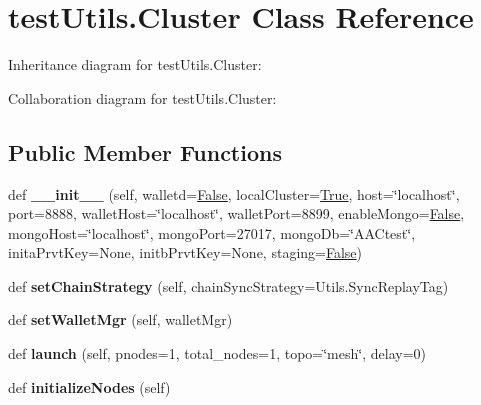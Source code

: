 \hypertarget{classtest_utils_1_1_cluster}{}\section{test\+Utils.\+Cluster Class Reference}
\label{classtest_utils_1_1_cluster}


Inheritance diagram for test\+Utils.\+Cluster\+:


Collaboration diagram for test\+Utils.\+Cluster\+:
\subsection*{Public Member Functions}
\begin{DoxyCompactItemize}
\item 
\mbox{\label{classtest_utils_1_1_cluster_ab2d7ec8d74a311ceee4f6b42bee4f88c}} 
def {\bfseries \+\_\+\+\_\+init\+\_\+\+\_\+} (self, walletd=\mbox{\hyperlink{struct_false}{False}}, local\+Cluster=\mbox{\hyperlink{struct_true}{True}}, host=\char`\"{}localhost\char`\"{}, port=8888, wallet\+Host=\char`\"{}localhost\char`\"{}, wallet\+Port=8899, enable\+Mongo=\mbox{\hyperlink{struct_false}{False}}, mongo\+Host=\char`\"{}localhost\char`\"{}, mongo\+Port=27017, mongo\+Db=\char`\"{}A\+A\+Ctest\char`\"{}, inita\+Prvt\+Key=None, initb\+Prvt\+Key=None, staging=\mbox{\hyperlink{struct_false}{False}})
\item 
\mbox{\label{classtest_utils_1_1_cluster_a304c4b3d051f19d04ddf469395f2e423}} 
def {\bfseries set\+Chain\+Strategy} (self, chain\+Sync\+Strategy=Utils.\+Sync\+Replay\+Tag)
\item 
\mbox{\label{classtest_utils_1_1_cluster_afdb75cb3ad0b2cb8f7f6a6da68f89654}} 
def {\bfseries set\+Wallet\+Mgr} (self, wallet\+Mgr)
\item 
\mbox{\label{classtest_utils_1_1_cluster_a53ea5a1d511716a983eccb1b1c06f7c9}} 
def {\bfseries launch} (self, pnodes=1, total\+\_\+nodes=1, topo=\char`\"{}mesh\char`\"{}, delay=0)
\item 
\mbox{\label{classtest_utils_1_1_cluster_af7065f867507314bb9cd1a51763a3d63}} 
def {\bfseries initialize\+Nodes} (self)

\end{DoxyCompactItemize}
